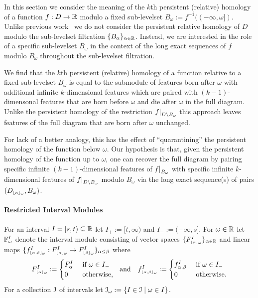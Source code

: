 
In this section we consider the meaning of the $k$th persistent (relative) homology of a function $f : D\to \mathbb{R}$ modulo a fixed sub-levelset $B_\omega := f^{-1}((-\infty,\omega])$.
Unlike previous work~\cite{cohen09extending} we do not consider the persistent relative homology of $D$ modulo the sub-levelset filtration $\{B_\alpha\}_{\alpha\in\mathbb{R}}$.
Instead, we are interested in the role of a specific sub-levelset $B_\omega$ in the context of the long exact sequences of $f$ modulo $B_\omega$ throughout the sub-levelset filtration.

We find that the $k$th persistent (relative) homology of a function relative to a fixed sub-levelset $B_\omega$ is equal to the submodule of features born after $\omega$ with additional infinite $k$-dimensional features which are paired with $(k-1)$-dimensonal features that are born before $\omega$ and die after $\omega$ in the full diagram.
Unlike the persistent homology of the restriction $f\mathord{\mid}_{D\setminus B_\omega}$ this approach leaves features of the full diagram that are born after $\omega$ unchanged.

For lack of a better analogy, this has the effect of ``quarantining'' the persistent homology of the function below $\omega$.
Our hypothesis is that, given the persistent homology of the function up to $\omega$, one can recover the full diagram by pairing specific infinite $(k-1)$-dimensional features of $f\mathord{\mid}_{B_\omega}$ with specific infinite $k$-dimensional features of $f\mathord{\mid}_{D\setminus B_\omega}$ modulo $B_\omega$ via the long exact sequence(s) of pairs $(D_{\scriptscriptstyle \lfloor\alpha\rfloor_{\omega}}, B_\omega)$.

\paragraph{Restricted Interval Modules}

For an interval $I = [s,t)\subseteq \mathbb{R}$ let $I_+ := [t,\infty)$ and $I_- := (-\infty, s]$.
For $\omega\in\mathbb{R}$ let $\mathbb{F}_{\omega}^I$ denote the interval module consisting of vector spaces $\{F_{\scriptscriptstyle \lfloor\alpha\rfloor_{\omega}}^I\}_{\alpha\in\mathbb{R}}$ and linear maps $\{f_{\scriptscriptstyle \lfloor\alpha,\beta\rfloor_{\omega}}^I : F_{\scriptscriptstyle \lfloor\alpha\rfloor_{\omega}}^I\to F_{\scriptscriptstyle \lfloor\beta\rfloor_{\omega}}^I\}_{\alpha\leq\beta}$ where
\[ F_{\scriptscriptstyle \lfloor\alpha\rfloor_{\omega}}^I := \begin{cases} F_\alpha^I&\text{ if } \omega\in I_-\\ 0&\text{ otherwise,}\end{cases}\ \text{ and }\ \ f_{\scriptscriptstyle \lfloor\alpha,\beta\rfloor_{\omega}}^I := \begin{cases} f_{\alpha,\beta}^I&\text{ if } \omega\in I_-\\ 0&\text{ otherwise.}\end{cases}\]
For a collection $\mathcal{I}$ of intervals let $\mathcal{I}_\omega := \{I\in\mathcal{I}\mid \omega\in I\}$.


